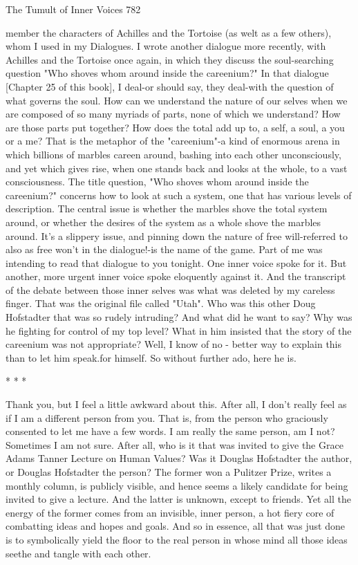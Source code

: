 The Tumult of Inner Voices                                                        782

member the characters of Achilles and the Tortoise (as welt as a few others), whom I
used in my Dialogues. I wrote another dialogue more recently, with Achilles and the
Tortoise once again, in which they discuss the soul-searching question "Who shoves
whom around inside the careenium?" In that dialogue [Chapter 25 of this book], I
deal-or should say, they deal-with the question of what governs the soul. How can we
understand the nature of our selves when we are composed of so many myriads of
parts, none of which we understand? How are those parts put together? How does the
total add up to, a self, a soul, a you or a me?
        That is the metaphor of the "careenium"-a kind of enormous arena in which
billions of marbles careen around, bashing into each other unconsciously, and yet
which gives rise, when one stands back and looks at the whole, to a vast
consciousness. The title question, "Who shoves whom around inside the careenium?"
concerns how to look at such a system, one that has various levels of description. The
central issue is whether the marbles shove the total system around, or whether the
desires of the system as a whole shove the marbles around. It's a slippery issue, and
pinning down the nature of free will-referred to also as free won't in the dialogue!-is
the name of the game.
        Part of me was intending to read that dialogue to you tonight. One inner voice
spoke for it. But another, more urgent inner voice spoke eloquently against it. And the
transcript of the debate between those inner selves was what was deleted by my
careless finger. That was the original file called "Utah".
        Who was this other Doug Hofstadter that was so rudely intruding? And what
did he want to say? Why was he fighting for control of my top level? What in him
insisted that the story of the careenium was not appropriate? Well, I know of no -
better way to explain this than to let him speak.for himself. So without further ado,
here he is.

                                         *   *   *

        Thank you, but I feel a little awkward about this. After all, I don't really feel as
if I am a different person from you. That is, from the person who graciously
consented to let me have a few words. I am really the same person, am I not?
Sometimes I am not sure. After all, who is it that was invited to give the Grace Adams
Tanner Lecture on Human Values? Was it Douglas Hofstadter the author, or Douglas
Hofstadter the person? The former won a Pulitzer Prize, writes a monthly column, is
publicly visible, and hence seems a likely candidate for being invited to give a lecture.
And the latter is unknown, except to friends. Yet all the energy of the former comes
from an invisible, inner person, a hot fiery core of combatting ideas and hopes and
goals. And so in essence, all that was just done is to symbolically yield the floor to the
real person in whose mind all those ideas seethe and tangle with each other.





